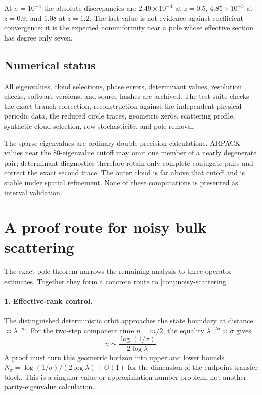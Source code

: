 \documentclass[11pt]{article}
\theoremstyle{definition}
\theoremstyle{remark}
\begin{document}
At $\sigma=10^{-4}$ the absolute discrepancies are $2.49\times10^{-4}$ at
$z=0.5$, $4.85\times10^{-3}$ at $z=0.9$, and $1.08$ at $z=1.2$.
The last value is not evidence against coefficient convergence; it is the
expected nonuniformity near a pole whose effective section has degree only
seven.

\subsection{Numerical status}

All eigenvalues, cloud selections, phase errors, determinant values,
resolution checks, software versions, and source hashes are archived.  The
test suite checks the exact branch correction, reconstruction against the
independent physical periodic data, the reduced circle traces, geometric
zeros, scattering profile, synthetic cloud selection, row stochasticity, and
pole removal.

The sparse eigenvalues are ordinary double-precision calculations.  ARPACK
values near the 80-eigenvalue cutoff may omit one member of a nearly
degenerate pair; determinant diagnostics therefore retain only complete
conjugate pairs and correct the exact second trace.  The outer cloud is far
above that cutoff and is stable under spatial refinement.  None of these
computations is presented as interval validation.

\section{A proof route for noisy bulk scattering}
\label{sec:route-map}

The exact pole theorem narrows the remaining analysis to three operator
estimates.  Together they form a concrete route to
\cref{conj:noisy-scattering}.

\paragraph{1. Effective-rank control.}
The distinguished deterministic orbit approaches the state boundary at
distance $\asymp\lambda^{-m}$.  For the two-step component time $n=m/2$,
the equality $\lambda^{-2n}\asymp\sigma$ gives
\begin{equation}\label{eq:rank-clock}
 n\sim\frac{\log(1/\sigma)}{2\log\lambda}.
\end{equation}
A proof must turn this geometric horizon into upper and lower bounds
$N_\sigma=\log(1/\sigma)/(2\log\lambda)+O(1)$ for the dimension of the
endpoint transfer block.  This is a singular-value or approximation-number
problem, not another parity-eigenvalue calculation.
\end{document}
